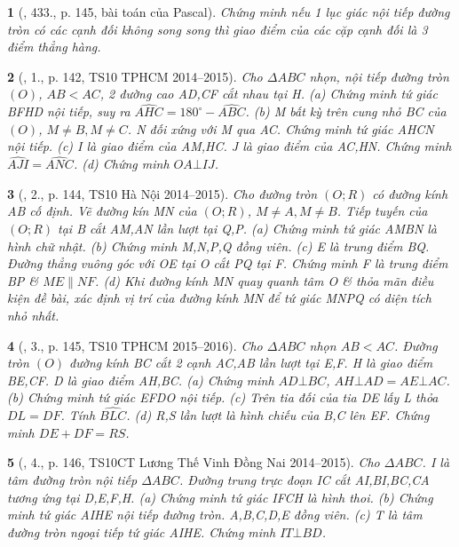 \documentclass{article}
\newtheorem{baitoan}{}
\begin{document}
\begin{baitoan}[\cite{Binh_Toan_9_tap_2}, 433., p. 145, bài toán của Pascal]
	Chứng minh nếu 1 lục giác nội tiếp đường tròn có các cạnh đối không song song thì giao điểm của các cặp cạnh đối là 3 điểm thẳng hàng.
\end{baitoan}

\begin{baitoan}[\cite{Thu_Chung_Viet_Minh_circ}, 1., p. 142, TS10 TPHCM 2014--2015]
	Cho $\Delta ABC$ nhọn, nội tiếp đường tròn $(O)$, $AB < AC$, 2 đường cao AD,CF cắt nhau tại H. (a) Chứng minh tứ giác BFHD nội tiếp, suy ra $\widehat{AHC} = 180^\circ - \widehat{ABC}$. (b) M bất kỳ trên cung nhỏ BC của $(O)$, $M\ne B,M\ne C$. N đối xứng với M qua AC. Chứng minh tứ giác AHCN nội tiếp. (c) I là giao điểm của AM,HC. J là giao điểm của AC,HN. Chứng minh $\widehat{AJI} = \widehat{ANC}$. (d) Chứng minh $OA\bot IJ$.
\end{baitoan}

\begin{baitoan}[\cite{Thu_Chung_Viet_Minh_circ}, 2., p. 144, TS10 Hà Nội 2014--2015]
	Cho đường tròn $(O;R)$ có đường kính AB cố định. Vẽ đường kín MN của $(O;R)$, $M\ne A,M\ne B$. Tiếp tuyến của $(O;R)$ tại B cắt AM,AN lần lượt tại Q,P. (a) Chứng minh tứ giác AMBN là hình chữ nhật. (b) Chứng minh M,N,P,Q đồng viên. (c) E là trung điểm BQ. Đường thẳng vuông góc với OE tại O cắt PQ tại F. Chứng minh F là trung điểm BP \& $ME\parallel NF$. (d) Khi đường kính MN quay quanh tâm O \& thỏa mãn điều kiện đề bài, xác định vị trí của đường kính MN để tứ giác MNPQ có diện tích nhỏ nhất.
\end{baitoan}

\begin{baitoan}[\cite{Thu_Chung_Viet_Minh_circ}, 3., p. 145, TS10 TPHCM 2015--2016]
	Cho $\Delta ABC$ nhọn $AB < AC$. Đường tròn $(O)$ đường kính BC cắt 2 cạnh AC,AB lần lượt tại E,F. H là giao điểm BE,CF. D là giao điểm AH,BC. (a) Chứng minh $AD\bot BC$, $AH\bot AD = AE\bot AC$. (b) Chứng minh tứ giác EFDO nội tiếp. (c) Trên tia đối của tia DE lấy L thỏa $DL = DF$. Tính $\widehat{BLC}$. (d) R,S lần lượt là hình chiếu của B,C lên EF. Chứng minh $DE + DF = RS$.
\end{baitoan}

\begin{baitoan}[\cite{Thu_Chung_Viet_Minh_circ}, 4., p. 146, TS10CT Lương Thế Vinh Đồng Nai 2014--2015]
	Cho $\Delta ABC$. I là tâm đường tròn nội tiếp $\Delta ABC$. Đường trung trực đoạn IC cắt AI,BI,BC,CA tương ứng tại D,E,F,H. (a) Chứng minh tứ giác IFCH là hình thoi. (b) Chứng minh tứ giác AIHE nội tiếp đường tròn. A,B,C,D,E đồng viên. (c) T là tâm đường tròn ngoại tiếp tứ giác AIHE. Chứng minh $IT\bot BD$.
\end{baitoan}
\end{document}
